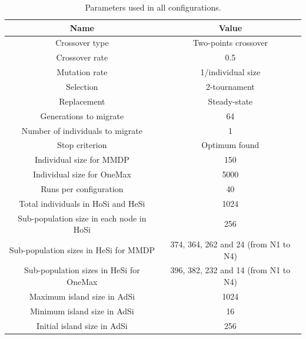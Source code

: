 \documentclass[final,1p,times]{elsarticle}
\begin{document}
\begin{table}
\centering
\caption{Parameters used in all configurations.}
\begin{tabular}{|c|c|} \hline
Name & Value\\ \hline

Crossover type & Two-points crossover \\ \hline
Crossover rate & 0.5\\ \hline
Mutation rate & 1/individual size\\ \hline
Selection & 2-tournament \\ \hline
Replacement & Steady-state\\ \hline
Generations to migrate & 64 \\ \hline
Number of individuals to migrate & 1 \\ \hline
Stop criterion & Optimum found \\ \hline
Individual size for MMDP & 150 \\ \hline
Individual size for OneMax & 5000 \\ \hline
Runs per configuration & 40 \\ \hline
\hline
Total individuals in HoSi and HeSi & 1024\\ \hline \hline
Sub-population size in each node in HoSi & 256  \\ \hline
Sub-population sizes in HeSi for MMDP & 374, 364, 262 and 24 (from N1 to N4)\\ \hline
Sub-population sizes in HeSi for OneMax & 396,  382, 232 and 14 (from N1 to N4)\\ \hline
\hline
Maximum island size in AdSi & 1024 \\ \hline
Minimum island size in AdSi & 16 \\ \hline
Initial island size in AdSi & 256 \\ \hline 
\end{tabular}
\label{table:parameters}
\end{table}
\end{document}
